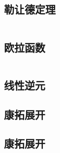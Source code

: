 \documentclass[titlepage,landscape,a4paper,10pt]{article}
\begin{document}
\begin{multicols}{2}
\begin{spacing}{0.8}
\subsection{勒让德定理}
\inputminted{cpp}{NumberTheory/Legendre.cpp}

\subsection{欧拉函数}
\inputminted{cpp}{NumberTheory/欧拉函数.cpp}

\subsection{线性逆元}


\subsection{康拓展开}


\subsection{康拓展开}




\end{spacing}
\end{multicols}
\end{document}
